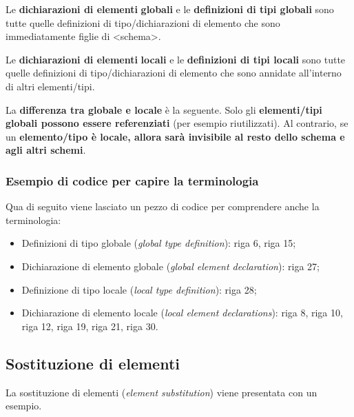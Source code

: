 \documentclass[a4paper]{article}
\begin{document}
	Le \textbf{dichiarazioni di elementi} \textcolor{Red3}{\textbf{globali}} e le \textbf{definizioni di tipi globali} sono tutte quelle definizioni di tipo/dichiarazioni di elemento che sono immediatamente figlie di \textsf{<schema>}.\newline
	
	\noindent
	Le \textbf{dichiarazioni di elementi} \textcolor{Red3}{\textbf{locali}} e le \textbf{definizioni di tipi locali} sono tutte quelle definizioni di tipo/dichiarazioni di elemento che sono annidate all'interno di altri elementi/tipi.\newline
	
	\noindent
	La \textbf{differenza tra globale e locale} è la seguente. Solo gli \textbf{elementi/tipi globali possono essere referenziati} (per esempio riutilizzati). Al contrario, se un \textbf{elemento/tipo è locale, allora sarà invisibile al resto dello schema e agli altri schemi}.
	\newpage
	
	\subsubsection{Esempio di codice per capire la terminologia}
	
	Qua di seguito viene lasciato un pezzo di codice per comprendere anche la terminologia:
	
	\begin{itemize}
		\item Definizioni di tipo globale (\emph{global type definition}): riga 6, riga 15;
		
		\item Dichiarazione di elemento globale (\emph{global element declaration}): riga 27;
		
		\item Definizione di tipo locale (\emph{local type definition}): riga 28;
		
		\item Dichiarazione di elemento locale (\emph{local element declarations}): riga 8, riga 10, riga 12, riga 19, riga 21, riga 30.
	\end{itemize}\newpage
	
	\subsection{Sostituzione di elementi}\label{par: sostituzione di elementi}
	
	La sostituzione di elementi (\emph{element substitution}) viene presentata con un esempio.\newline
	
\end{document}
